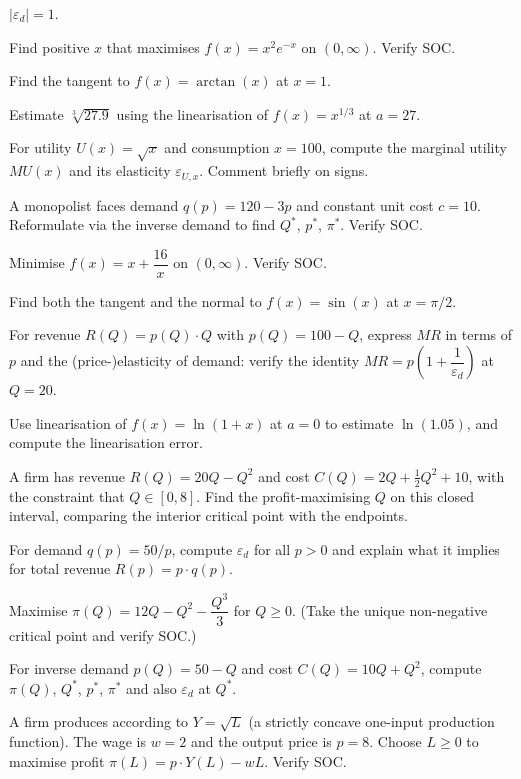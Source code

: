 \begin{problems}
        $|\varepsilon_d|=1$.
  \item Find positive $x$ that maximises $f(x)=x^2e^{-x}$ on
        $(0,\infty)$. Verify SOC.
  \item Find the tangent to $f(x)=\arctan(x)$ at $x=1$.
  \item Estimate $\sqrt[3]{27.9}$ using the linearisation of
        $f(x)=x^{1/3}$ at $a=27$.
  \item For utility $U(x)=\sqrt{x}$ and consumption $x=100$, compute the
        marginal utility $MU(x)$ and its elasticity $\varepsilon_{U,x}$.
        Comment briefly on signs.
  \item A monopolist faces demand $q(p)=120-3p$ and constant unit cost
        $c=10$. Reformulate via the inverse demand to find $Q^*$, $p^*$,
        $\pi^*$. Verify SOC.
  \item Minimise $f(x)=x+\dfrac{16}{x}$ on $(0,\infty)$. Verify SOC.
  \item Find both the tangent and the normal to $f(x)=\sin(x)$ at
        $x=\pi/2$.
  \item For revenue $R(Q)=p(Q)\cdot Q$ with $p(Q)=100-Q$, express $MR$ in
        terms of $p$ and the (price-)elasticity of demand: verify the
        identity $MR = p\left(1+\dfrac{1}{\varepsilon_d}\right)$ at
        $Q=20$.
  \item Use linearisation of $f(x)=\ln(1+x)$ at $a=0$ to estimate
        $\ln(1.05)$, and compute the linearisation error.
  \item A firm has revenue $R(Q)=20Q-Q^2$ and cost
        $C(Q)=2Q+\frac12Q^2+10$, with the constraint that $Q\in[0,8]$.
        Find the profit-maximising $Q$ on this closed interval, comparing
        the interior critical point with the endpoints.
  \item For demand $q(p)=50/p$, compute $\varepsilon_d$ for all $p>0$ and
        explain what it implies for total revenue $R(p)=p\cdot q(p)$.
  \item Maximise $\pi(Q)=12Q-Q^2-\dfrac{Q^3}{3}$ for $Q\ge0$. (Take the
        unique non-negative critical point and verify SOC.)
  \item For inverse demand $p(Q)=50-Q$ and cost $C(Q)=10Q+Q^2$, compute
        $\pi(Q)$, $Q^*$, $p^*$, $\pi^*$ and also $\varepsilon_d$ at $Q^*$.
  \item A firm produces according to $Y=\sqrt{L}$ (a strictly concave
        one-input production function). The wage is $w=2$ and the output
        price is $p=8$. Choose $L\ge0$ to maximise profit
        $\pi(L)=p\cdot Y(L)-wL$. Verify SOC.
\end{problems}

